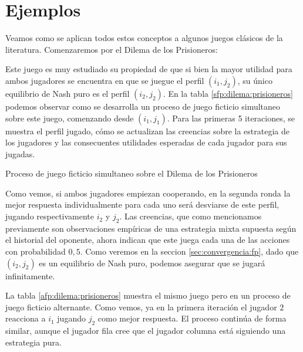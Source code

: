 

\section{Ejemplos}

Veamos como se aplican todos estos conceptos a algunos juegos clásicos de la literatura. Comenzaremos por el Dilema de los Prisioneros:





Este juego es muy estudiado su propiedad de que si bien la mayor utilidad para ambos jugadores se encuentra en que se juegue el perfil $(i_1, j_2)$, su único equilibrio de Nash puro es el perfil $(i_2, j_2)$. En la tabla \ref{sfp:dilema:prisioneros} podemos observar como se desarrolla un proceso de juego ficticio simultaneo sobre este juego, comenzando desde $(i_1, j_1)$. Para las primeras 5 iteraciones, se muestra el perfil jugado, cómo se actualizan las creencias sobre la estrategia de los jugadores y las consecuentes utilidades esperadas de cada jugador para sus jugadas.

\begin{table} %
    \centering
    
    \caption{Proceso de juego ficticio simultaneo sobre el Dilema de los Prisioneros}
    \label{sfp:dilema:prisioneros}
\end{table}

Como vemos, si ambos jugadores empiezan cooperando, en la segunda ronda la mejor respuesta individualmente para cada uno será desviarse de este perfil, jugando respectivamente $i_2$ y $j_2$. Las creencias, que como mencionamos previamente son observaciones empíricas de una estrategia mixta supuesta según el historial del oponente, ahora indican que este juega cada una de las acciones con probabilidad $0,5$. Como veremos en la seccion \ref{sec:convergencia:fp}, dado que $(i_2, j_2)$ es un equilibrio de Nash puro, podemos asegurar que se jugará infinitamente.

La tabla \ref{afp:dilema:prisioneros} muestra el mismo juego pero en un proceso de juego ficticio alternante. Como vemos, ya en la primera iteración el jugador $2$ reacciona a $i_1$ jugando $j_2$ como mejor respuesta. El proceso continúa de forma similar, aunque el jugador fila cree que el jugador columna está siguiendo una estrategia pura.

